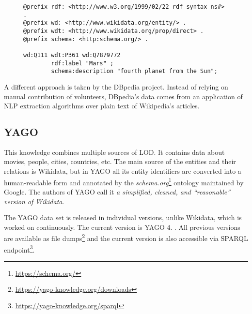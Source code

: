 \begin{figure}[h]
\begin{lstlisting}[language = Turtle, caption={Wikidata content sample}, label={wikidataexample},captionpos=b escapeinside={(*@}{@*)}]
@prefix rdf: <http://www.w3.org/1999/02/22-rdf-syntax-ns#> .
@prefix wd: <http://www.wikidata.org/entity/> .
@prefix wdt: <http://www.wikidata.org/prop/direct> .
@prefix schema: <http:schema.org/> .

wd:Q111 wdt:P361 wd:Q7879772
        rdf:label "Mars" ;
        schema:description "fourth planet from the Sun";
\end{lstlisting}
\end{figure}

A different approach is taken by the DBpedia project. Instead of relying on manual contribution of volunteers, DBpedia's data comes from an application of NLP extraction algorithms over plain text of Wikipedia's articles. 

\subsection{YAGO}

This knowledge combines multiple sources of LOD. It contains data about movies, people, cities, countries, etc. The main source of the entities and their relations is Wikidata, but in YAGO all its entity identifiers are converted into a human-readable form and annotated by the \textit{schema.org}\footnote{\href{https://schema.org/}{https://schema.org/}} ontology maintained by Google. The authors of YAGO call it \textit{a simplified, cleaned, and “reasonable” version of Wikidata}.\cite{yagoweb}

The YAGO data set is released in individual versions, unlike Wikidata, which is worked on continuously. The current version is YAGO 4. \cite{yago4}. All previous versions are available as file dumps\footnote{\href{https://yago-knowledge.org/downloads}{https://yago-knowledge.org/downloads}} and the current version is also accessible via SPARQL endpoint\footnote{\href{https://yago-knowledge.org/sparql}{https://yago-knowledge.org/sparql}}.